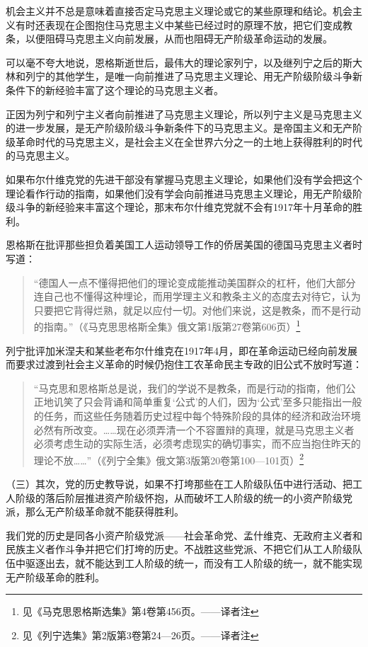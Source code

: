 机会主义并不总是意味着直接否定马克思主义理论或它的某些原理和结论。机会主义有时还表现在企图抱住马克思主义中某些已经过时的原理不放，把它们变成教条，以便阻碍马克思主义向前发展，从而也阻碍无产阶级革命运动的发展。

可以毫不夸大地说，恩格斯逝世后，最伟大的理论家列宁，以及继列宁之后的斯大林和列宁的其他学生，是唯一向前推进了马克思主义理论、用无产阶级阶级斗争新条件下的新经验丰富了这个理论的马克思主义者。

正因为列宁和列宁主义者向前推进了马克思主义理论，所以列宁主义是马克思主义的进一步发展，是无产阶级阶级斗争新条件下的马克思主义。是帝国主义和无产阶级革命时代的马克思主义，是社会主义在全世界六分之一的土地上获得胜利的时代的马克思主义。

如果布尔什维克党的先进干部没有掌握马克思主义理论，如果他们没有学会把这个理论看作行动的指南，如果他们没有学会向前推进马克思主义理论，用无产阶级阶级斗争的新经验来丰富这个理论，那末布尔什维克党就不会有1917年十月革命的胜利。

恩格斯在批评那些担负着美国工人运动领导工作的侨居美国的德国马克思主义者时写道：

\begin{quotation}
“德国人一点不懂得把他们的理论变成能推动美国群众的杠杆，他们大部分连自己也不懂得这种埋论，而用学理主义和教条主义的态度去对待它，认为只要把它背得烂熟，就足以应付一切。对他们来说，这是教条，而不是行动的指南。”（《马克思思格斯全集》俄文第1版第27卷第606页）\footnote{见《马克思恩格斯选集》第4卷第456页。——译者注}
\end{quotation}

列宁批评加米涅夫和某些老布尔什维克在1917年4月，即在革命运动已经向前发展而要求过渡到社会主义革命的时候仍抱住工农革命民主专政的旧公式不放时写道：

\begin{quotation}
“马克思和恩格斯总是说，我们的学说不是教条，而是行动的指南，他们公正地讥笑了只会背诵和简单重复‘公式’的人们，因为‘公式’至多只能指出一般的任务，而这些任务随着历史过程中每个特殊阶段的具体的经济和政治环境必然有所改变。……现在必须弄清一个不容置辩的真理，就是马克思主义者必须考虑生动的实际生活，必须考虑现实的确切事实，而不应当抱住昨天的理论不放……”（《列宁全集》俄文第3版第20卷第100—101页）\footnote{见《列宁选集》第2版第3卷第24—26页。——译者注}
\end{quotation}

（三）其次，党的历史教导说，如果不打垮那些在工人阶级队伍中进行活动、把工人阶级的落后阶层推进资产阶级怀抱，从而破坏工人阶级的统一的小资产阶级党派，那么无产阶级革命就不能获得胜利。

我们党的历史是同各小资产阶级党派——社会革命党、孟什维克、无政府主义者和民族主义者作斗争并把它们打垮的历史。不战胜这些党派、不把它们从工人阶级队伍中驱逐出去，就不能达到工人阶级的统一，而没有工人阶级的统一，就不能实现无产阶级革命的胜利。

